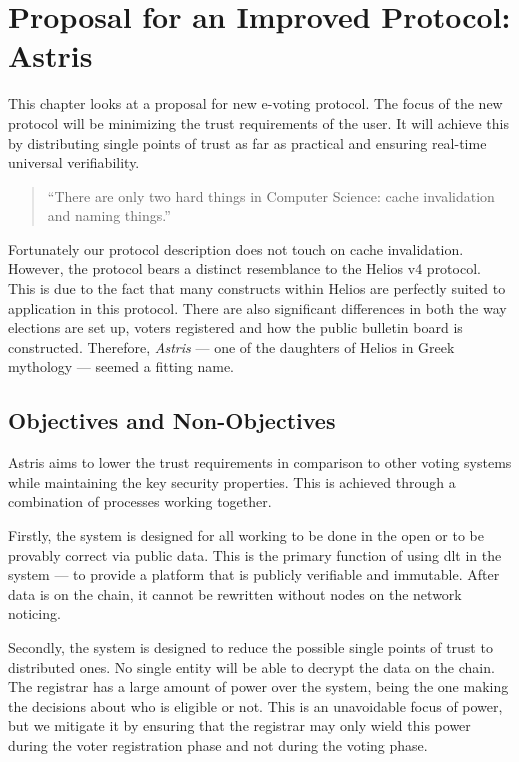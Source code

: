
\chapter{Proposal for an Improved Protocol: Astris}
\label{ch:astris}

This chapter looks at a proposal for new e-voting protocol. The focus of the new protocol will be minimizing the trust requirements of the user. It will achieve this by distributing single points of trust as far as practical and ensuring real-time universal verifiability.

\begin{quote}
    ``There are only two hard things in Computer Science: cache invalidation and naming things.''

\end{quote}

Fortunately our protocol description does not touch on cache invalidation. However, the protocol bears a distinct resemblance to the Helios v4 protocol. This is due to the fact that many constructs within Helios are perfectly suited to application in this protocol. There are also significant differences in both the way elections are set up, voters registered and how the public bulletin board is constructed. Therefore, \emph{Astris} --- one of the daughters of Helios in Greek mythology --- seemed a fitting name.

\section{Objectives and Non-Objectives}
\label{ch:astris:aims}

Astris aims to lower the trust requirements in comparison to other voting systems while maintaining the key security properties. This is achieved through a combination of processes working together.

Firstly, the system is designed for all working to be done in the open or to be provably correct via public data. This is the primary function of using \gls{dlt} in the system --- to provide a platform that is publicly verifiable and immutable. After data is on the chain, it cannot be rewritten without nodes on the network noticing.

Secondly, the system is designed to reduce the possible single points of trust to distributed ones. No single entity will be able to decrypt the data on the chain. The registrar has a large amount of power over the system, being the one making the decisions about who is eligible or not. This is an unavoidable focus of power, but we mitigate it by ensuring that the registrar may only wield this power during the voter registration phase and not during the voting phase.

